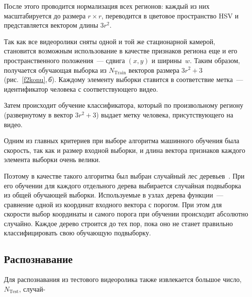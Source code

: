 \begin{multicols}{2}
После этого проводится нормализация всех регионов: каждый из них масштабируется до размера 
$r\times r$, переводится в цветовое пространство HSV и представляется вектором длины $3r^2$. 

Так как все видеоролики сняты одной и той же стационарной камерой, становится возможным 
использование в качестве признаков региона еще и его пространственного положения~--- сдвига 
$(x,y)$ и ширины~$w$. Таким образом, получается обучающая выборка из $N_{\mathrm{Train}}$ векторов 
размера $3r^2 + 3$ (рис.~\ref{f2konu},\,\textit{б}). Каждому элементу выборки ставится в 
соответствие метка~--- идентификатор человека с соответствующего видео. 

Затем происходит обучение классификатора, который по произвольному региону (развернутому в 
вектор $3r^2 + 3$) выдает метку человека, присутствующего на видео.

Одним из главных критериев при выборе алгоритма машинного обучения была скорость, так как 
и размер входной выборки, и длина вектора признаков каждого элемента выборки очень велики. 

Поэтому в качестве такого алгоритма был выбран случайный лес деревьев~\cite{2konu}. При его 
обуче\-нии для каждого отдельного дерева выбирается случайная подвыборка из общей 
обуча\-ющей выборки. Используемые в узлах дерева функции~--- сравнение одной из координат 
входного вектора с порогом. При этом для скорости выбор координаты и самого порога при 
обучении происходит абсолютно случайно. Каждое дерево строится до тех пор, пока оно не 
станет правильно классифицировать свою обучающую подвыборку.

\subsection{Распознавание}

Для распознавания из тестового видеоролика также извлекается большое число, $N_{\mathrm{Test}}$, 
случай-\linebreak\vspace*{-12pt}
\pagebreak

\end{multicols}

\begin{figure} %
\vspace*{1pt}
\begin{center}
\mbox{%
\epsfxsize=164.162mm
}
\end{center}
\vspace*{-9pt}
\end{figure}

